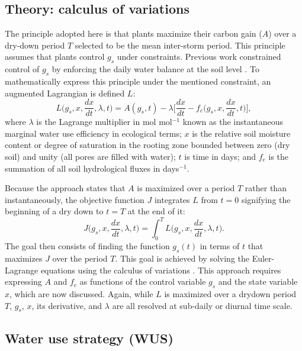 \documentclass[utf8]{frontiersSCNS} %
\begin{document}
\subsection{Theory: calculus of variations}

The principle adopted here is that plants maximize their carbon gain ($A$) over a dry-down period $T$ selected to be the mean inter-storm period. This principle assumes that plants control $g_s$ under constraints. Previous work constrained control of $g_s$ by enforcing the daily water balance at the soil level \citep{manzoni_optimization_2013}. To mathematically express this principle under the mentioned constraint, an augmented Lagrangian is defined $L$:
\begin{equation}
    \label{eqn:Lagrangian}
    L\Big(g_s, x, \frac{dx}{dt}, \lambda, t\Big) = A(g_s, t) - \lambda \Bigg[ \frac{dx}{dt} - f_e\Big(g_s, x, \frac{dx}{dt}, t\Big)\Bigg],
\end{equation}
where $\lambda$ is the Lagrange multiplier in mol mol$^{-1}$ known as the instantaneous marginal water use efficiency in ecological terms; $x$ is the relative soil moisture content or degree of saturation in the rooting zone bounded between zero (dry soil) and unity (all pores are filled with water); $t$ is time in days; and $f_e$ is the summation of all soil hydrological fluxes in days$^{-1}$.

Because the approach states that $A$ is maximized over a period $T$ rather than instantaneously, the objective function $J$ integrates $L$ from $t=0$ signifying the beginning of a dry down to $t=T$ at the end of it:
\begin{equation}
    \label{eqn:Objective}
    J\Big(g_s, x, \frac{dx}{dt}, \lambda, t\Big) = \int_0^T L\Big(g_s, x, \frac{dx}{dt}, \lambda, t\Big).
\end{equation}
The goal then consists of finding the function $g_s(t)$ in terms of $t$ that maximizes $J$ over the period $T$. This goal is achieved by solving the Euler-Lagrange equations using the calculus of variations \citep{witelski_variational_2015}. This approach requires expressing $A$ and $f_e$ as functions of the control variable $g_s$ and the state variable $x$, which are now discussed. Again, while $L$ is maximized over a drydown period $T$, $g_s$, $x$, its derivative, and $\lambda$ are all resolved at sub-daily or diurnal time scale.

\subsection{Water use strategy (WUS)}
\end{document}
